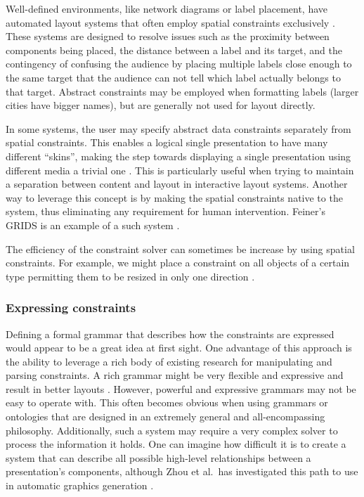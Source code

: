       Well-defined environments, like network diagrams or label placement, have
      automated layout systems that often employ spatial constraints
      exclusively \citep{kosak-1,christensen-1}. These systems are designed to
      resolve issues such as the proximity between components being placed, the
      distance between a label and its target, and the contingency of confusing
      the audience by placing multiple labels close enough to the same target
      that the audience can not tell which label actually belongs to that target.
      Abstract constraints may be employed when formatting labels (larger
      cities have bigger names), but are generally not used for layout
      directly.

      In some systems, the user may specify abstract data constraints
      separately from spatial constraints. This enables a logical single
      presentation to have many different ``skins'', making the step towards
      displaying a single presentation using different media a trivial one
      \citep{weitzman-2}. This is particularly useful when trying to maintain a
      separation between content and layout in interactive layout systems.
      Another way to leverage this concept is by making the spatial constraints
      native to the system, thus eliminating any requirement for human
      intervention. Feiner’s GRIDS is an example of a such system
      \citep{feiner-1}.

      The efficiency of the constraint solver can sometimes be increase by
      using spatial constraints. For example, we might place a constraint on
      all objects of a certain type permitting them to be resized in only one
      direction \citep{linton-1}.
     
    \subsubsection{Expressing constraints}

     Defining a formal grammar that describes how the constraints are expressed
     would appear to be a great idea at first sight. One advantage of this
     approach is the ability to leverage a rich body of existing research for
     manipulating and parsing constraints. A rich grammar might be very
     flexible and expressive and result in better layouts \citep{weitzman-1}.
     However, powerful and expressive grammars may not be easy to operate with.
     This often becomes obvious when using grammars or ontologies that are
     designed in an extremely general and all-encompassing philosophy.
     Additionally, such a system may require a very complex solver to process
     the information it holds. One can imagine how difficult it is to create a
     system that can describe all possible high-level relationships between a
     presentation's components, although Zhou et al.\ has investigated this path
     to use in automatic graphics generation \citep{zhou-1}.

